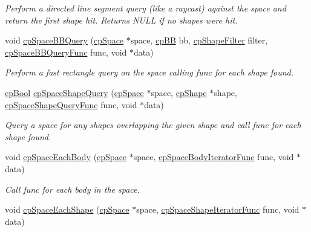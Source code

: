 \begin{DoxyCompactItemize}
\begin{DoxyCompactList}\small\item\em Perform a directed line segment query (like a raycast) against the space and return the first shape hit. Returns N\+U\+L\+L if no shapes were hit. \end{DoxyCompactList}\item 
void \hyperlink{group__cp_space_ga6f74f9dd9fc523b65483d96e2272f0d9}{cp\+Space\+B\+B\+Query} (\hyperlink{structcp_space}{cp\+Space} $\ast$space, \hyperlink{structcp_b_b}{cp\+B\+B} bb, \hyperlink{structcp_shape_filter}{cp\+Shape\+Filter} filter, \hyperlink{group__cp_space_ga02779238e9b8c07797aae6139fad203c}{cp\+Space\+B\+B\+Query\+Func} func, void $\ast$data)
\begin{DoxyCompactList}\small\item\em Perform a fast rectangle query on the space calling {\ttfamily func} for each shape found. \end{DoxyCompactList}\item 
\hypertarget{group__cp_space_ga8415bcc9318df0a7e50e1e2cc612ccd2}{}\hyperlink{group__basic_types_gabc5e752c48f3449ca26ef413ecbd647e}{cp\+Bool} \hyperlink{group__cp_space_ga8415bcc9318df0a7e50e1e2cc612ccd2}{cp\+Space\+Shape\+Query} (\hyperlink{structcp_space}{cp\+Space} $\ast$space, \hyperlink{structcp_shape}{cp\+Shape} $\ast$shape, \hyperlink{group__cp_space_gab124952dd71dea36688f6ff6ff8bdcb2}{cp\+Space\+Shape\+Query\+Func} func, void $\ast$data)\label{group__cp_space_ga8415bcc9318df0a7e50e1e2cc612ccd2}

\begin{DoxyCompactList}\small\item\em Query a space for any shapes overlapping the given shape and call {\ttfamily func} for each shape found. \end{DoxyCompactList}\item 
\hypertarget{group__cp_space_gab526f8e9ea517058d4d90509e971120d}{}void \hyperlink{group__cp_space_gab526f8e9ea517058d4d90509e971120d}{cp\+Space\+Each\+Body} (\hyperlink{structcp_space}{cp\+Space} $\ast$space, \hyperlink{group__cp_space_ga2870b1128c5bfe79cb261d269abdea64}{cp\+Space\+Body\+Iterator\+Func} func, void $\ast$data)\label{group__cp_space_gab526f8e9ea517058d4d90509e971120d}

\begin{DoxyCompactList}\small\item\em Call {\ttfamily func} for each body in the space. \end{DoxyCompactList}\item 
\hypertarget{group__cp_space_gac652c40a648d64651b4b36baab354802}{}void \hyperlink{group__cp_space_gac652c40a648d64651b4b36baab354802}{cp\+Space\+Each\+Shape} (\hyperlink{structcp_space}{cp\+Space} $\ast$space, \hyperlink{group__cp_space_gafae017c9a8a7c082032035bf165e4ec9}{cp\+Space\+Shape\+Iterator\+Func} func, void $\ast$data)\label{group__cp_space_gac652c40a648d64651b4b36baab354802}


\end{DoxyCompactItemize}
